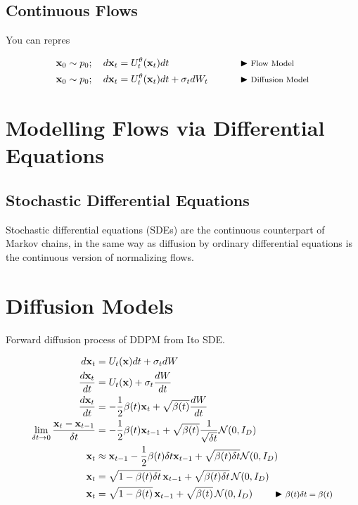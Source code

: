 \documentclass[a4paper, 11pt]{article}
\begin{document}
\subsection{Continuous Flows}

You can repres

\begin{align}
    \mbox{$\mbox{$\mathbf{x}$}$}_0 \sim p_0; \quad d\mbox{$\mbox{$\mathbf{x}$}$}_t &= U_t^{\theta}(\mbox{$\mbox{$\mathbf{x}$}$}_t) dt &&\qquad \blacktriangleright\text{\footnotesize Flow Model} \\
    \mbox{$\mbox{$\mathbf{x}$}$}_0 \sim p_0; \quad d\mbox{$\mbox{$\mathbf{x}$}$}_t &= U_t^{\theta}(\mbox{$\mbox{$\mathbf{x}$}$}_t) dt + \sigma_t dW_t && \qquad \blacktriangleright\text{\footnotesize Diffusion Model}
\end{align}


\section{Modelling Flows via Differential Equations}

\subsection{Stochastic Differential Equations}
Stochastic differential equations (SDEs) are the continuous counterpart of Markov chains, in the same way
as diffusion by ordinary differential equations is the continuous version of normalizing flows.

\section{Diffusion Models}


Forward diffusion process of DDPM from Ito SDE.

\begin{align}
    d\mbox{$\mbox{$\mathbf{x}$}$}_t &= U_t(\mbox{$\mbox{$\mathbf{x}$}$}) dt + \sigma_t dW \label{eq:ito-sde}\\ 
    \frac{d\mbox{$\mbox{$\mathbf{x}$}$}_t}{dt} &= U_t(\mbox{$\mbox{$\mathbf{x}$}$}) + \sigma_t \frac{dW}{dt} \\ 
    \frac{d \mbox{$\mbox{$\mathbf{x}$}$}_t}{dt} &= -\frac{1}{2} \beta(t) \mbox{$\mbox{$\mathbf{x}$}$}_t + \sqrt{\beta(t)} \frac{dW}{dt} \\
    \lim_{\delta t \to 0} \frac{\mbox{$\mbox{$\mathbf{x}$}$}_t - \mbox{$\mbox{$\mathbf{x}$}$}_{t-1}}{\delta t} &= -\frac{1}{2} \beta(t)\mbox{$\mbox{$\mathbf{x}$}$}_{t-1} +  \sqrt{\beta(t)} \frac{1}{\sqrt{\delta t}} \mbox{$\cal N$}(0, I_D) \\
    \mbox{$\mbox{$\mathbf{x}$}$}_t &\approx \mbox{$\mbox{$\mathbf{x}$}$}_{t-1} -\frac{1}{2} \beta(t)\delta t \mbox{$\mbox{$\mathbf{x}$}$}_{t-1} + \sqrt{\beta(t)\delta t} \mbox{$\cal N$}(0, I_D) \\
    \mbox{$\mbox{$\mathbf{x}$}$}_t &= \sqrt{1 - \beta(t)\delta t}\, \mbox{$\mbox{$\mathbf{x}$}$}_{t-1} + \sqrt{\beta(t)\delta t}\, \mbox{$\cal N$}(0, I_D) \\
    \mbox{$\mbox{$\mathbf{x}$}$}_t &= \sqrt{1 - \beta(t)}\, \mbox{$\mbox{$\mathbf{x}$}$}_{t-1} + \sqrt{\beta(t)} \, \mbox{$\cal N$}(0, I_D) \qquad \blacktriangleright\text{\footnotesize $\beta(t) \delta t = \beta(t)$}
\end{align}
\end{document}
